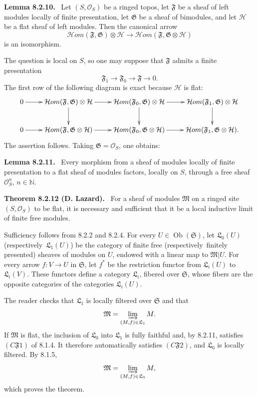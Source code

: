\documentclass[11pt]{article}
\newcommand{\Hh}{\mathcal{H}}
\newcommand{\ob}{\operatorname{Ob}}
\newcommand{\Hhom}{\mathcal{H}om}
\newcommand{\resp}{respectively}
\newcommand{\Ss}{\mathfrak{S}}
\newcommand{\Ll}{\mathfrak{L}}
\newcommand{\Mm}{\mathfrak{M}}
\newcommand{\Ff}{\mathfrak{F}}
\newcommand{\Gg}{\mathfrak{G}}
\newcommand{\Oo}{\mathcal{O}}
\newenvironment{statement}[1]{\par\medskip\noindent\textbf{#1.}\ }{\par\medskip}
\begin{document}
\begin{statement}{Lemma 8.2.10}
Let $(S,\Oo_S)$ be a ringed topos, let $\Ff$ be a sheaf of left modules locally of finite presentation, let $\Gg$ be a sheaf of bimodules, and let $\Hh$ be a flat sheaf of left modules. Then the canonical arrow
\[
        \Hhom(\Ff,\Gg)\otimes\Hh\longrightarrow
        \Hhom(\Ff,\Gg\otimes\Hh)
\]
is an isomorphism.
\end{statement}

The question is local on $S$, so one may suppose that $\Ff$ admits a finite presentation
\[
        \Ff_1\to\Ff_0\to\Ff\to 0.
\]
The first row of the following diagram is exact because $\Hh$ is flat:
\[
\xymatrix{
0\ar[r]&\Hhom(\Ff,\Gg)\otimes\Hh\ar[r]\ar[d]&
\Hhom(\Ff_0,\Gg)\otimes\Hh\ar[r]\ar[d]&
\Hhom(\Ff_1,\Gg)\otimes\Hh\ar[d]\\
0\ar[r]&\Hhom(\Ff,\Gg\otimes\Hh)\ar[r]&
\Hhom(\Ff_0,\Gg\otimes\Hh)\ar[r]&
\Hhom(\Ff_1,\Gg\otimes\Hh).
}
\]
The assertion follows. Taking $\Gg=\Oo_S$, one obtains:

\begin{statement}{Lemma 8.2.11}
Every morphism from a sheaf of modules locally of finite presentation to a flat sheaf of modules factors, locally on $S$, through a free sheaf $\Oo_S^n$, $n\in\mathbb N$.
\end{statement}

\begin{statement}{Theorem 8.2.12 (D. Lazard)}
For a sheaf of modules $\Mm$ on a ringed site $(S,\Oo_S)$ to be flat, it is necessary and sufficient that it be a local inductive limit of finite free modules.
\end{statement}

Sufficiency follows from 8.2.2 and 8.2.4. For every $U\in\ob(\Ss)$, let $\Ll_0(U)$ (\resp\ $\Ll_1(U)$) be the category of finite free (\resp\ finitely presented) sheaves of modules on $U$, endowed with a linear map to $\Mm|U$. For every arrow $f:V\to U$ in $\Ss$, let $f^*$ be the restriction functor from $\Ll_i(U)$ to $\Ll_i(V)$. These functors define a category $\Ll_i$, fibered over $\Ss$, whose fibers are the opposite categories of the categories $\Ll_i(U)$.

The reader checks that $\Ll_1$ is locally filtered over $\Ss$ and that
\[
        \Mm=\varinjlim_{(M,f)\in\Ll_1}M.
\]
If $\Mm$ is flat, the inclusion of $\Ll_0$ into $\Ll_1$ is fully faithful and, by 8.2.11, satisfies $(C\mathfrak F1)$ of 8.1.4. It therefore automatically satisfies $(C\mathfrak F2)$, and $\Ll_0$ is locally filtered. By 8.1.5,
\[
        \Mm=\varinjlim_{(M,f)\in\Ll_0}M,
\]
which proves the theorem.
\end{document}
